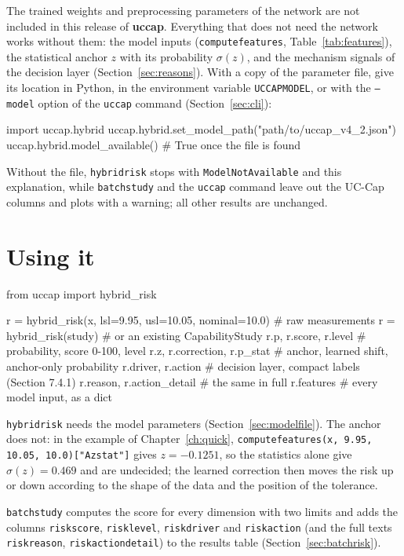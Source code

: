 \documentclass[a4paper,11pt,oneside,openany,parskip=half-,headings=standardclasses,toc=flat,numbers=noenddot]{scrbook}
\newcommand{\code}[1]{\texttt{\begingroup\def\_{\textunderscore\allowbreak}#1\endgroup}}
\newcommand{\pkg}{\textsf{\bfseries uccap}}
\newcommand{\secref}[1]{Section~\ref{#1}}
\newcommand{\chapref}[1]{Chapter~\ref{#1}}
\newcommand{\tabref}[1]{Table~\ref{#1}}
\begin{document}
The trained weights and preprocessing parameters of the network are not included in this release of \pkg{}.
Everything that does not need the network works without them: the
model inputs (\code{compute\_features}, \tabref{tab:features}), the statistical anchor $z$ with its probability
$\sigma(z)$, and the mechanism signals of the decision layer (\secref{sec:reasons}). With a copy of the parameter
file, give its location in Python, in the environment variable \code{UCCAP\_MODEL}, or with the \code{--model}
option of the \code{uccap} command (\secref{sec:cli}):

\begin{pycode}
import uccap.hybrid
uccap.hybrid.set_model_path("path/to/uccap_v4_2.json")
uccap.hybrid.model_available()          # True once the file is found
\end{pycode}

Without the file, \code{hybrid\_risk} stops with \code{ModelNotAvailable} and this explanation, while
\code{batch\_study} and the \code{uccap} command leave out the UC-Cap columns and plots with a warning; all other
results are unchanged.

\section{Using it}

\begin{pycode}
from uccap import hybrid_risk

r = hybrid_risk(x, lsl=9.95, usl=10.05, nominal=10.0)   # raw measurements
r = hybrid_risk(study)                                   # or an existing CapabilityStudy
r.p, r.score, r.level          # probability, score 0-100, level
r.z, r.correction, r.p_stat    # anchor, learned shift, anchor-only probability
r.driver, r.action             # decision layer, compact labels (Section 7.4.1)
r.reason, r.action_detail      # the same in full
r.features                     # every model input, as a dict
\end{pycode}

\code{hybrid\_risk} needs the model parameters (\secref{sec:modelfile}). The anchor does not: in the example of
\chapref{ch:quick}, \code{compute\_features(x, 9.95, 10.05, 10.0)["A\_z\_stat\_133"]} gives $z = -0.1251$, so the
statistics alone give $\sigma(z) = 0.469$ and are undecided; the learned correction then moves the risk up or down
according to the shape of the data and the position of the tolerance.

\code{batch\_study} computes the score for every dimension with two limits and adds the columns
\code{risk\_score}, \code{risk\_level}, \code{risk\_driver} and \code{risk\_action} (and the full texts
\code{risk\_reason}, \code{risk\_action\_detail}) to the results table (\secref{sec:batchrisk}).
\end{document}
